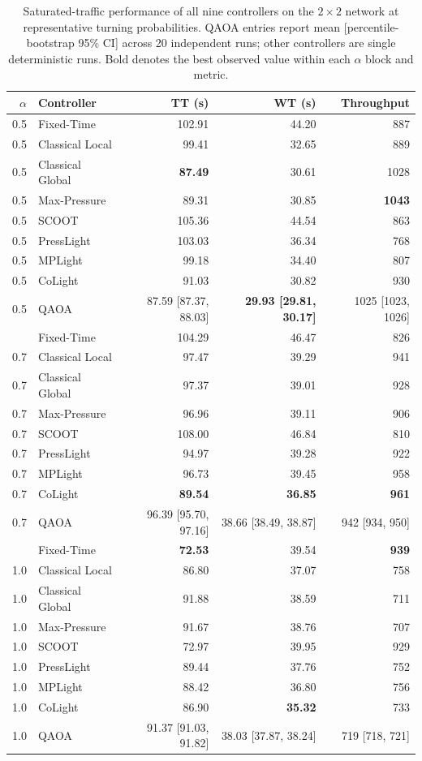 \begin{table}[htbp]
\centering
\scriptsize
\setlength{\tabcolsep}{4pt}
\caption{Saturated-traffic performance of all nine controllers on the $2\times2$ network at representative turning probabilities. QAOA entries report mean [percentile-bootstrap 95\% CI] across 20 independent runs; other controllers are single deterministic runs. Bold denotes the best observed value within each $\alpha$ block and metric.}
\label{tab:saturated-2x2-all-controller-summary}
\begin{tabular}{rlrrr}
\toprule
$\alpha$ & Controller & TT (s) & WT (s) & Throughput \\
\midrule
0.5 & Fixed-Time & 102.91 & 44.20 & 887 \\
0.5 & Classical Local & 99.41 & 32.65 & 889 \\
0.5 & Classical Global & \textbf{87.49} & 30.61 & 1028 \\
0.5 & Max-Pressure & 89.31 & 30.85 & \textbf{1043} \\
0.5 & SCOOT & 105.36 & 44.54 & 863 \\
0.5 & PressLight & 103.03 & 36.34 & 768 \\
0.5 & MPLight & 99.18 & 34.40 & 807 \\
0.5 & CoLight & 91.03 & 30.82 & 930 \\
0.5 & QAOA & 87.59 [87.37, 88.03] & \textbf{29.93 [29.81, 30.17]} & 1025 [1023, 1026] \\
\addlinespace
0.7 & Fixed-Time & 104.29 & 46.47 & 826 \\
0.7 & Classical Local & 97.47 & 39.29 & 941 \\
0.7 & Classical Global & 97.37 & 39.01 & 928 \\
0.7 & Max-Pressure & 96.96 & 39.11 & 906 \\
0.7 & SCOOT & 108.00 & 46.84 & 810 \\
0.7 & PressLight & 94.97 & 39.28 & 922 \\
0.7 & MPLight & 96.73 & 39.45 & 958 \\
0.7 & CoLight & \textbf{89.54} & \textbf{36.85} & \textbf{961} \\
0.7 & QAOA & 96.39 [95.70, 97.16] & 38.66 [38.49, 38.87] & 942 [934, 950] \\
\addlinespace
1.0 & Fixed-Time & \textbf{72.53} & 39.54 & \textbf{939} \\
1.0 & Classical Local & 86.80 & 37.07 & 758 \\
1.0 & Classical Global & 91.88 & 38.59 & 711 \\
1.0 & Max-Pressure & 91.67 & 38.76 & 707 \\
1.0 & SCOOT & 72.97 & 39.95 & 929 \\
1.0 & PressLight & 89.44 & 37.76 & 752 \\
1.0 & MPLight & 88.42 & 36.80 & 756 \\
1.0 & CoLight & 86.90 & \textbf{35.32} & 733 \\
1.0 & QAOA & 91.37 [91.03, 91.82] & 38.03 [37.87, 38.24] & 719 [718, 721] \\
\bottomrule
\end{tabular}
\end{table}


